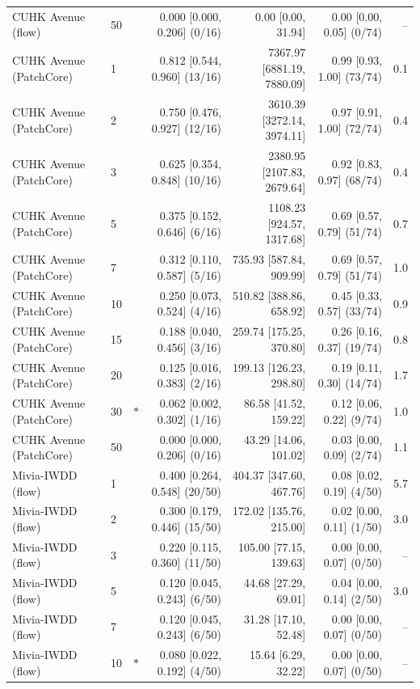\begin{table}[t]
{\begin{tabular}{llcrrrr}
CUHK Avenue (flow) & 50 &  & 0.000 [0.000, 0.206] (0/16) & 0.00 [0.00, 31.94] & 0.00 [0.00, 0.05] (0/74) & -- \\
CUHK Avenue (PatchCore) & 1 &  & 0.812 [0.544, 0.960] (13/16) & 7367.97 [6881.19, 7880.09] & 0.99 [0.93, 1.00] (73/74) & 0.1 \\
CUHK Avenue (PatchCore) & 2 &  & 0.750 [0.476, 0.927] (12/16) & 3610.39 [3272.14, 3974.11] & 0.97 [0.91, 1.00] (72/74) & 0.4 \\
CUHK Avenue (PatchCore) & 3 &  & 0.625 [0.354, 0.848] (10/16) & 2380.95 [2107.83, 2679.64] & 0.92 [0.83, 0.97] (68/74) & 0.4 \\
CUHK Avenue (PatchCore) & 5 &  & 0.375 [0.152, 0.646] (6/16) & 1108.23 [924.57, 1317.68] & 0.69 [0.57, 0.79] (51/74) & 0.7 \\
CUHK Avenue (PatchCore) & 7 &  & 0.312 [0.110, 0.587] (5/16) & 735.93 [587.84, 909.99] & 0.69 [0.57, 0.79] (51/74) & 1.0 \\
CUHK Avenue (PatchCore) & 10 &  & 0.250 [0.073, 0.524] (4/16) & 510.82 [388.86, 658.92] & 0.45 [0.33, 0.57] (33/74) & 0.9 \\
CUHK Avenue (PatchCore) & 15 &  & 0.188 [0.040, 0.456] (3/16) & 259.74 [175.25, 370.80] & 0.26 [0.16, 0.37] (19/74) & 0.8 \\
CUHK Avenue (PatchCore) & 20 &  & 0.125 [0.016, 0.383] (2/16) & 199.13 [126.23, 298.80] & 0.19 [0.11, 0.30] (14/74) & 1.7 \\
CUHK Avenue (PatchCore) & 30 & $\ast$ & 0.062 [0.002, 0.302] (1/16) & 86.58 [41.52, 159.22] & 0.12 [0.06, 0.22] (9/74) & 1.0 \\
CUHK Avenue (PatchCore) & 50 &  & 0.000 [0.000, 0.206] (0/16) & 43.29 [14.06, 101.02] & 0.03 [0.00, 0.09] (2/74) & 1.1 \\
Mivia-IWDD (flow) & 1 &  & 0.400 [0.264, 0.548] (20/50) & 404.37 [347.60, 467.76] & 0.08 [0.02, 0.19] (4/50) & 5.7 \\
Mivia-IWDD (flow) & 2 &  & 0.300 [0.179, 0.446] (15/50) & 172.02 [135.76, 215.00] & 0.02 [0.00, 0.11] (1/50) & 3.0 \\
Mivia-IWDD (flow) & 3 &  & 0.220 [0.115, 0.360] (11/50) & 105.00 [77.15, 139.63] & 0.00 [0.00, 0.07] (0/50) & -- \\
Mivia-IWDD (flow) & 5 &  & 0.120 [0.045, 0.243] (6/50) & 44.68 [27.29, 69.01] & 0.04 [0.00, 0.14] (2/50) & 3.0 \\
Mivia-IWDD (flow) & 7 &  & 0.120 [0.045, 0.243] (6/50) & 31.28 [17.10, 52.48] & 0.00 [0.00, 0.07] (0/50) & -- \\
Mivia-IWDD (flow) & 10 & $\ast$ & 0.080 [0.022, 0.192] (4/50) & 15.64 [6.29, 32.22] & 0.00 [0.00, 0.07] (0/50) & -- \\

\end{tabular}}
\end{table}
